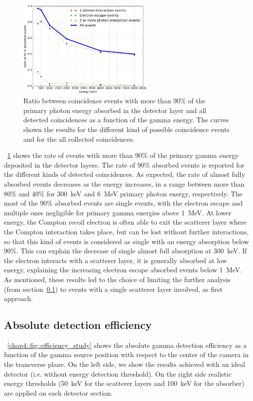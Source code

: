 \begin{figure} [!hbtp]	
\centering
\includegraphics[width=0.6\textwidth]{03_GraphicFiles/chapter4_HTsimu/new/90absFracVSenergy_hadronth.png}
\caption{Ratio between coincidence events with more than 90\% of the primary photon energy absorbed in the detector layer and all detected coincidences as a function of the gamma energy. The curves shown the results for the different kind of possible coincidence events and for the all collected coincidences.}
\label{chap4::fig::rate_full_abs}
\end{figure}

\figurename~\ref{chap4::fig::rate_full_abs} shows the rate of events with more than 90\% of the primary gamma energy deposited in the detector layers. The rate of 90\% absorbed events is reported for the different kinds of detected coincidences. As expected, the rate of almost fully absorbed events decreases as the energy increases, in a range between more than 80\% and 40\% for 300~keV and 6~MeV primary photon energy, respectively. The most of the 90\% absorbed events are single events, with the electron escape and multiple ones negligible for primary gamma energies above 1~MeV. At lower energy, the Compton recoil electron is often able to exit the scatterer layer where the Compton interaction takes place, but can be lost without further interactions, so that this kind of events is considered as single with an energy absorption below 90\%. This can explain the decrease of single almost full absorption at 300~keV. If the electron interacts with a scatterer layer, it is generally absorbed at low energy, explaining the increasing electron escape absorbed events below 1~MeV. 
As mentioned, these results led to the choice of limiting the further analysis (from section~\ref{chap4::subsec::Results_efficiency}) to events with a single scatterer layer involved, as first approach.

 \subsection{Absolute detection efficiency}\label{chap4::subsec::Results_efficiency}
\figurename~\ref{chap4::fig::efficiency_study} shows the absolute gamma detection efficiency as a function of the gamma source position with respect to the center of the camera in the transverse plane. On the left side, we show the results achieved with an ideal detector (i.e. without energy detection threshold). On the right side realistic energy thresholds (50~keV for the scatterer layers and 100~keV for the absorber) are applied on each detector section.

